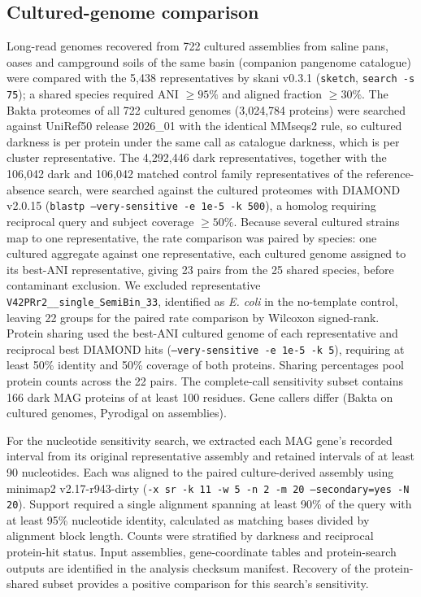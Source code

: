 \documentclass[11pt]{article}
\begin{document}
\subsection*{Cultured-genome comparison}
Long-read genomes recovered from 722 cultured assemblies from saline pans, oases and campground soils of the
same basin (companion pangenome catalogue) were compared with the 5{,}438 representatives by skani
v0.3.1 (\texttt{sketch}, \texttt{search -s 75}); a shared species required ANI $\geq 95\%$ and aligned
fraction $\geq 30\%$. The Bakta proteomes of all 722 cultured genomes (3{,}024{,}784 proteins) were
searched against UniRef50 release 2026\_01 with the identical MMseqs2 rule, so cultured darkness is per protein under
the same call as catalogue darkness, which is per cluster representative. The 4{,}292{,}446 dark
representatives, together with the 106{,}042 dark and 106{,}042 matched control family
representatives of the reference-absence search, were searched against the cultured proteomes with
DIAMOND v2.0.15 (\texttt{blastp --very-sensitive -e 1e-5 -k 500}), a homolog requiring reciprocal
query and subject coverage $\geq 50\%$. Because several cultured strains map to one representative,
the rate comparison was paired by species: one cultured aggregate against one representative, each
cultured genome assigned to its best-ANI representative, giving 23 pairs from the 25 shared species,
before contaminant exclusion. We excluded representative \texttt{V42PRr2\_\_single\_SemiBin\_33},
identified as \emph{E. coli} in the no-template control, leaving 22 groups for the paired rate
comparison by Wilcoxon signed-rank. Protein sharing used the best-ANI cultured genome of each
representative and reciprocal best DIAMOND hits (\texttt{--very-sensitive -e 1e-5 -k 5}),
requiring at least 50\% identity and 50\% coverage of both proteins. Sharing percentages pool
protein counts across the 22 pairs. The complete-call sensitivity subset contains 166 dark MAG
proteins of at least 100 residues. Gene callers differ (Bakta on cultured genomes, Pyrodigal
on assemblies).

For the nucleotide sensitivity search, we extracted each MAG gene's recorded interval from its
original representative assembly and retained intervals of at least 90 nucleotides. Each was
aligned to the paired culture-derived assembly using minimap2 v2.17-r943-dirty
(\texttt{-x sr -k 11 -w 5 -n 2 -m 20 --secondary=yes -N 20}). Support required a single
alignment spanning at least 90\% of the query with at least 95\% nucleotide identity, calculated
as matching bases divided by alignment block length. Counts were stratified by darkness and
reciprocal protein-hit status. Input assemblies, gene-coordinate tables and protein-search outputs
are identified in the analysis checksum manifest. Recovery of the protein-shared subset provides
a positive comparison for this search's sensitivity.
\end{document}
